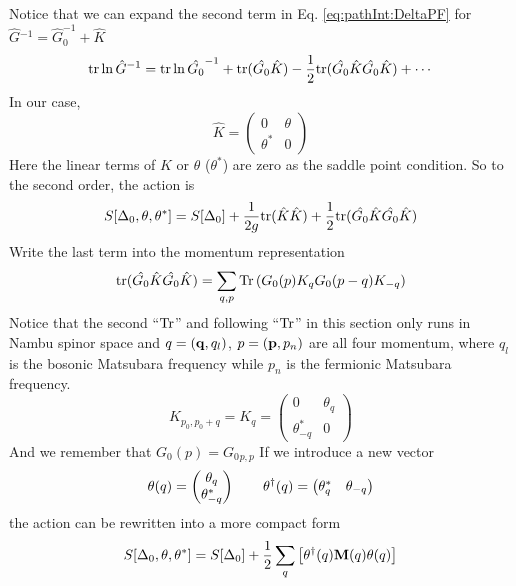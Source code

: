 Notice that we can expand the second term in Eq. \ref{eq:pathInt:DeltaPF} for $\hat{G}{}^{-1}=\hat{G}_{0}^{-1}+\hat{K}$
\begin{equation}\label{eq:pathInt:expand}
\text{tr}\ln \hat{G}^{-1}=\text{tr}\ln\hat{G_{0}}^{-1}+\text{tr}(\hat{G_{0}}\hat{K})-\frac{1}{2}\text{tr}(\hat{G_{0}}\hat{K}\hat{G_{0}}\hat{K})+\cdots
\end{equation}
In our case,
\begin{equation}
\hat{K}=\begin{pmatrix}
0&\theta\\
\theta^{*}&0
\end{pmatrix}
\end{equation}
Here the linear terms of $\hat{K}$ or $\theta$ ($\theta^{*}$) are zero as the saddle point condition.  So to the second order, the action is 
\begin{equation}\label{eq:pathInt:DeltaActionGaussian}
S[\Delta_{0},\theta,\theta^{*}]=S[\Delta_{0}]+
	\frac{1}{2g}\text{tr}(\hat{K}\hat{K})+\frac{1}{2}\text{tr}(\hat{G_{0}}\hat{K}\hat{G_{0}}\hat{K})
\end{equation}
Write the last term into the momentum representation
\begin{equation}
\text{tr}(\hat{G_{0}}\hat{K}\hat{G_{0}}\hat{K})=\sum_{q,p}\text{Tr}\left(G_{0}({p})K_{q}G_{0}{}({p-q})K_{-q}\right)
\end{equation}
Notice that the second ``$\text{Tr}$'' and following ``$\text{Tr}$'' in this section only runs in Nambu spinor space and $q={(\mathbf{q},q_{l})}$, $p=(\mathbf{p},p_{n})$ are all four momentum, where $q_{l}$ is the bosonic Matsubara frequency while $p_{n}$ is the fermionic Matsubara frequency.
\begin{equation}
K_{p_{0},p_{0}+q}=K_{q}=\begin{pmatrix}
0&\theta_{q}\\
\theta^{*}_{-q}&0
\end{pmatrix}
\end{equation}
And we remember that $G_{0}(p)=G_{0}{}_{p,p}$
If we introduce  a new vector 
\begin{equation}
\theta{(q)}=\begin{pmatrix}\theta_{q}\\\theta^{*}_{-q}\end{pmatrix}\qquad
\theta^{\dagger}{(q)}=\begin{pmatrix}\theta^{*}_{q}&\theta_{-q}\end{pmatrix}
\end{equation}
the action can be rewritten into a more compact form
\begin{equation}
S[\Delta_{0},\theta,\theta^{*}]=S[\Delta_{0}]+\frac{1}{2}\sum_{q}\left[\theta^{\dagger}(q)\mathbf{M}(q)\theta(q)\right]
\end{equation}
